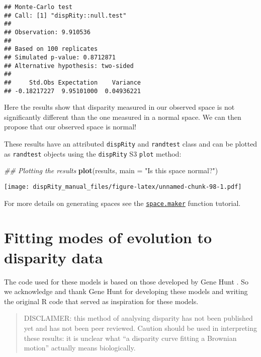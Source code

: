 \documentclass[
]{book}
\newenvironment{Shaded}{\begin{snugshade}}{\end{snugshade}}
\newcommand{\CommentTok}[1]{\textcolor[rgb]{0.56,0.35,0.01}{\textit{#1}}}
\newcommand{\DataTypeTok}[1]{\textcolor[rgb]{0.13,0.29,0.53}{#1}}
\newcommand{\KeywordTok}[1]{\textcolor[rgb]{0.13,0.29,0.53}{\textbf{#1}}}
\newcommand{\NormalTok}[1]{#1}
\newcommand{\StringTok}[1]{\textcolor[rgb]{0.31,0.60,0.02}{#1}}
\begin{document}
\begin{verbatim}
## Monte-Carlo test
## Call: [1] "dispRity::null.test"
## 
## Observation: 9.910536 
## 
## Based on 100 replicates
## Simulated p-value: 0.8712871 
## Alternative hypothesis: two-sided 
## 
##     Std.Obs Expectation    Variance 
## -0.18217227  9.95101000  0.04936221
\end{verbatim}

Here the results show that disparity measured in our observed space is not significantly different than the one measured in a normal space.
We can then propose that our observed space is normal!

These results have an attributed \texttt{dispRity} and \texttt{randtest} class and can be plotted as \texttt{randtest} objects using the \texttt{dispRity} S3 \texttt{plot} method:

\begin{Shaded}
\begin{Highlighting}[]
\CommentTok{\#\# Plotting the results}
\KeywordTok{plot}\NormalTok{(results, }\DataTypeTok{main =} \StringTok{"Is this space normal?"}\NormalTok{)}
\end{Highlighting}
\end{Shaded}

\texttt{[image: dispRity\_manual\_files/figure-latex/unnamed-chunk-98-1.pdf]}

For more details on generating spaces see the \protect\hyperlink{Simulating-multidimensional-spaces}{\texttt{space.maker}} function tutorial.

\hypertarget{model-fitting}{%
\section{Fitting modes of evolution to disparity data}\label{model-fitting}}

The code used for these models is based on those developed by Gene Hunt \citep{hunt2006fitting, hunt2012measuring, hunt2015simple}.
So we acknowledge and thank Gene Hunt for developing these models and writing the original R code that served as inspiration for these models.

\begin{quote}
DISCLAIMER: this method of analysing disparity has not been published yet and has not been peer reviewed. Caution should be used in interpreting these results: it is unclear what ``a disparity curve fitting a Brownian motion'' actually means biologically.
\end{quote}
\end{document}

